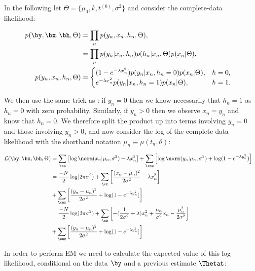 In the following let $\Theta = \{\mu_0, k, t^{(0)}, \sigma^2\}$ and consider the complete-data likelihood:

\begin{equation}
	\begin{aligned}
p(\by, \bx, \bh, \Theta) & = \prod_n p(y_n, x_n, h_n, \Theta), \\
& = \prod_n p(y_n | x_n, h_n) p(h_n | x_n, \Theta) p(x_n | \Theta), \\
	p(y_n, x_n, h_n, \Theta) & =
	\begin{cases}
		 (1 - e^{-\lambda x_n^2}) p(y_n | x_n, h_n = 0)  p(x_n | \Theta), & h = 0, \\
		 e^{-\lambda x_n^2} p(y_n | x_n, h_n = 1)  p(x_n | \Theta) , & h = 1. \\
	 \end{cases}
\end{aligned}
\end{equation}


We then use the same trick as \cite{pierson2015zifa}: if $y_n = 0$ then we know necessarily that $h_n = 1$ as $h_n = 0$ with zero probability. Similarly, if $y_n > 0$ then we observe $x_n = y_n$ and know that $h_n = 0$. We therefore split the product up into terms involving $y_n = 0$ and those involving $y_n > 0$, and now consider the log of the complete data likelihood with the shorthand notation $\mu_n \equiv \mu(t_n, \theta)$:

\begin{equation} \label{eq:lcl}
\begin{aligned}
\mathcal{L}(\by, \bx, \bh, \Theta) & = \sum_\cz \left[ \log \norm(x_n | \mu_n, \sigma^2) - \lambda x_n^2 \right] + \sum_\cnz \left[ \log \norm(y_n | \mu_n, \sigma^2) + \log(1 - e^{-\lambda y_n^2}) \right] \\
& = \frac{-N}{2} \log(2 \pi \sigma^2)
 + \sum_\cz \left[ \frac{(x_n - \mu_n)^2}{2 \sigma^2} - \lambda x_n^2 \right]\\
& + \sum_\cnz \left[ \frac{(y_n - \mu_n)^2}{2 \sigma^2} + \log(1 - e^{-\lambda y_n^2}) \right] \\
& = \frac{-N}{2} \log(2 \pi \sigma^2) +
\sum_\cz \left[ -(\frac{1}{2\sigma^2} + \lambda) x_n^2 + \frac{\mu_n}{\sigma^2} x_n - \frac{\mu_n^2}{2\sigma^2}\right] \\
& +
\sum_\cnz \left[ \frac{(y_n - \mu_n)^2}{2 \sigma^2} + \log(1 - e^{-\lambda y_n^2}) \right]
\end{aligned}
\end{equation}

In order to perform EM we need to calculate the expected value of this log likelihood, conditional on the data $\by$ and a previous estimate $\Thetat$:

